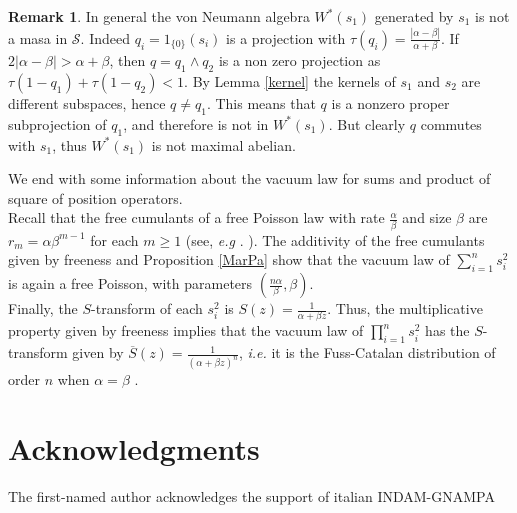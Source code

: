 \documentclass[12pt]{amsart}
\numberwithin{equation}{section}
\def\a{\alpha}
\def\b{\beta}
\theoremstyle{definition}
\newtheorem{rem}[thm]{Remark}
\begin{document}
\begin{rem}
In general the von Neumann algebra $W^*(s_1)$ generated by $s_1$ is not a masa in $\mathcal S$. Indeed $q_i=1_{\{0\}}(s_i)$ is a projection with $\displaystyle{\tau(q_i)=\frac{|\a-\b|}{\a+\b}}$. If $2|\a-\beta|>\a+\b$, then $q=q_1\wedge q_2$ is a non zero
  projection as $\tau(1-q_1)+\tau(1-q_2)<1$. By Lemma \ref{kernel} the kernels of $s_1$ and $s_2$ are different subspaces, hence $q\neq q_1$. This means that $q$ is a nonzero proper subprojection of $q_1$, and therefore is not in $W^*(s_1)$. But clearly $q$ commutes with $s_1$, thus $W^*(s_1)$ is not maximal abelian.
\end{rem}
We end with some information about the vacuum law for sums and product of square of position operators.\\
Recall that the free cumulants of a free Poisson law with rate $\frac{\a}{\b}$ and size $\b$ are $r_m=\a\b^{m-1}$ for each $m\geq 1$ (see, \textit{e.g} . \cite[Lecture 11]{NS}). The additivity of the free cumulants given by freeness and Proposition \ref{MarPa} show that the vacuum law of $\displaystyle{\sum_{i=1}^n s_i^2}$ is again a free Poisson, with parameters $(\frac{n\a}{\b}, \b)$.\\
Finally, the $S$-transform \cite{NS} of each $s_i^2$ is $S(z)=\frac{1}{\a+\b z}$. Thus, the multiplicative property given by freeness implies that the vacuum law of $\displaystyle{\prod_{i=1}^n s_i^2}$ has the $S$-transform given by $\overline{S}(z)=\frac{1}{(\a+\b z)^n}$, \textit{i.e.} it is the Fuss-Catalan distribution of order $n$ when $\a=\b$ \cite{Ml}.

\section*{Acknowledgments}
\noindent The first-named author acknowledges the support of italian INDAM-GNAMPA
\end{document}
